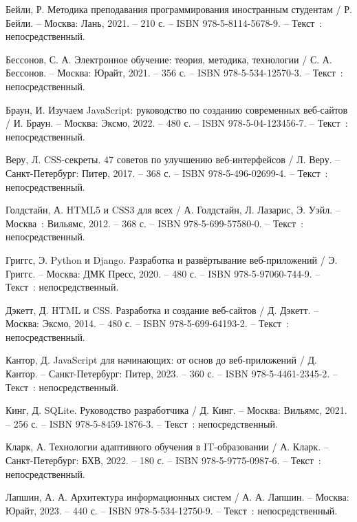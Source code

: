 
\begin{thebibliography}{9}

     Бейли, Р. Методика преподавания программирования иностранным студентам / Р. Бейли. – Москва: Лань, 2021. – 210 с. – ISBN 978-5-8114-5678-9. – Текст~: непосредственный.
    
     Бессонов, С. А. Электронное обучение: теория, методика, технологии / С. А. Бессонов. – Москва: Юрайт, 2021. – 356 с. – ISBN 978-5-534-12570-3. – Текст~: непосредственный.
    
     Браун, И. Изучаем JavaScript: руководство по созданию современных веб-сайтов / И. Браун. – Москва: Эксмо, 2022. – 480 с. – ISBN 978-5-04-123456-7. – Текст~: непосредственный.
    
     Веру, Л. CSS-секреты. 47 советов по улучшению веб-интерфейсов / Л. Веру. – Санкт-Петербург: Питер, 2017. – 368 с. – ISBN 978-5-496-02699-4. – Текст~: непосредственный.
    
    	Голдстайн, А. HTML5 и CSS3 для всех / А. Голдстайн, Л. Лазарис, Э. Уэйл. – Москва~: Вильямс, 2012. – 368 с. – ISBN 978-5-699-57580-0. – Текст~: непосредственный.
    
     Григгс, Э. Python и Django. Разработка и развёртывание веб-приложений / Э. Григгс. – Москва: ДМК Пресс, 2020. – 480 с. – ISBN 978-5-97060-744-9. – Текст~: непосредственный.
    
     Дэкетт, Д. HTML и CSS. Разработка и создание веб-сайтов / Д. Дэкетт. – Москва: Эксмо, 2014. – 480 с. – ISBN 978-5-699-64193-2. – Текст~: непосредственный.
	
     Кантор, Д. JavaScript для начинающих: от основ до веб-приложений / Д. Кантор. – Санкт-Петербург: Питер, 2023. – 360 с. – ISBN 978-5-4461-2345-2. – Текст~: непосредственный.
    
     Кинг, Д. SQLite. Руководство разработчика / Д. Кинг. – Москва: Вильямс, 2021. – 256 с. – ISBN 978-5-8459-1876-3. – Текст~: непосредственный.
    
     Кларк, А. Технологии адаптивного обучения в IT-образовании / А. Кларк. – Санкт-Петербург: БХВ, 2022. – 180 с. – ISBN 978-5-9775-0987-6. – Текст~: непосредственный.
    
     Лапшин, А. А. Архитектура информационных систем / А. А. Лапшин. – Москва: Юрайт, 2023. – 440 с. – ISBN 978-5-534-12750-9. – Текст~: непосредственный.
    

\end{thebibliography}
